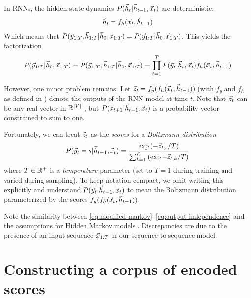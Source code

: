 In RNNs, the hidden state dynamics $P(\vec{h}_t | \vec{h}_{t-1}, \vec{x}_t)$ are deterministic:
\begin{equation}
  \vec{h}_t = f_h(\vec{x}_t, \vec{h}_{t-1})
\end{equation}
Which means that $P(\vec{y}_{1:T}, \vec{h}_{1:T} | \vec{h}_0, \vec{x}_{1:T}) = P(\vec{y}_{1:T} | \vec{h}_0, \vec{x}_{1:T})$.
This yields the factorization
\begin{equation}
  P(\vec{y}_{1:T} | \vec{h}_0, \vec{x}_{1:T})
  = P(\vec{y}_{1:T}, \vec{h}_{1:T} | \vec{h}_0, \vec{x}_{1:T})
  = \prod_{t=1}^T P(\vec{y}_t | \vec{h}_t, \vec{x}_t) f_h(\vec{x}_t, \vec{h}_{t-1})
\end{equation}

However, one minor problem remains. Let $\vec{z}_t = f_y(f_h(\vec{x}_t, \vec{h}_{t-1}))$ (with
$f_y$ and $f_h$ as defined in ) denote the outputs of the RNN model
at time $t$. Note that $\vec{z}_t$ can be any real vector in $\mathbb{R}^{|V|}$
, but $P(\vec{x}_{t+1} | \vec{h}_{t-1}, \vec{x}_{t})$ is
a probability vector constrained to sum to one.

Fortunately, we can treat $\vec{z}_t$ as the \emph{scores} for a \emph{Boltzmann
distribution}
\begin{equation}\label{eq:boltzmann-dist}
    P( \vec{y}_{t} = s | \vec{h}_{t-1}, \vec{x}_t )
    = \frac{\exp \left(-\vec{z}_{t,s}/T\right) }{ \sum_{k=1}^{K} \left(\exp -\vec{z}_{t,k}/T\right)}
\end{equation}
where $T \in \mathbb{R}^+$ is a \emph{temperature} parameter (set to $T=1$ during training and varied during sampling).
To keep notation compact, we omit writing this explicitly and understand $P(\vec{y}_t | \vec{h}_{t-1}, \vec{x}_t)$ to mean
the Boltzmann distribution parameterized by the scores $f_y(f_h(\vec{x}_t, \vec{h}_{t-1}))$.

Note the similarity between \cref{eq:modified-markov}--\cref{eq:output-independence}
and the assumptions for Hidden Markov models \citep{ramage2007hidden}. Discrepancies are due
to the presence of an input sequence $\vec{x}_{1:T}$ in our sequence-to-sequence model.




\section{Constructing a corpus of encoded scores}



